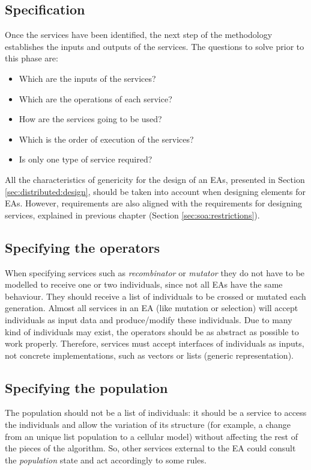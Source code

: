  

\subsection{Specification}

Once the services have been identified, the next step of the methodology establishes the inputs and outputs of the services. The questions to solve prior to this phase are:

\begin{itemize}
\item Which are the inputs of the services?
\item Which are the operations of each service?
\item How are the services going to be used?
\item Which is the order of execution of the services?
\item Is only one type of service required?
\end{itemize}

All the characteristics of genericity for the design of an EAs, presented in Section \ref{sec:distributed:design}, should be taken into account when designing elements for EAs. However, requirements are also aligned with the requirements for designing services, explained in previous chapter (Section \ref{sec:soa:restrictions}).


\subsection{Specifying the operators}
When specifying services such as 
{\em recombinator} or {\em mutator} they do not have to be modelled to receive one or two
individuals, since not all EAs have the same behaviour. They should receive a
list of individuals to be crossed or mutated each generation. Almost all services in an EA (like mutation or selection) will accept individuals as input data and produce/modify these individuals. Due to many kind of individuals may exist, the operators should be as abstract as possible to work properly. Therefore, services must accept interfaces of individuals as inputs, not concrete implementations, such as vectors or lists (generic representation). 

\subsection{Specifying the population} The population should not be a list of individuals: it should be a service
to access the individuals and allow the variation of its structure (for example, a change
from an unique list population to a cellular model) without
affecting  the rest of the pieces of the algorithm. So, other services
external to the EA could consult the {\em population} state and act
accordingly to some rules. 


